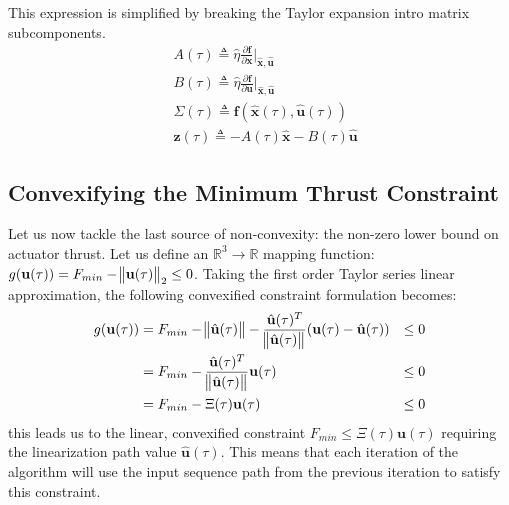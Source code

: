 This expression is simplified by breaking the Taylor expansion intro matrix subcomponents. 
\begin{align}
& A(\tau) \triangleq \hat{\eta} \frac{\partial \mathbf{f}}{\partial \mathbf{x}}  \bigg\rvert_{\mathbf{\hat{x}}, \mathbf{\hat{u}}} \\
& B(\tau) \triangleq \hat{\eta} \frac{\partial \mathbf{f}}{\partial \mathbf{u}}  \bigg\rvert_{\mathbf{\hat{x}}, \mathbf{\hat{u}}} \\
& \Sigma(\tau) \triangleq \mathbf{f}(\hat{\mathbf{x}}(\tau), \hat{\mathbf{u}}(\tau)) \\
& \mathbf{z}(\tau) \triangleq -A(\tau)\mathbf{\hat{x}}- B(\tau)\mathbf{\hat{u}}
\end{align}





\subsection{Convexifying the Minimum Thrust Constraint}
Let us now tackle the last source of non-convexity: the non-zero lower bound on actuator thrust. Let us define an $\mathbb{R}^3 \rightarrow \mathbb{R}$ mapping function: $g(\mathbf{u}(\tau)) = F_{min} - \norm{\mathbf{u}(\tau)}_2 \leq 0$. Taking the first order Taylor series linear approximation, the following convexified constraint formulation becomes:
%
\begin{align}
	g(\mathbf{u}(\tau)) &= F_{min} - \norm{\hat{\mathbf{u}}(\tau)} - \frac{\hat{\mathbf{u}}(\tau)^T}{\norm{\hat{\mathbf{u}}(\tau)}}(\mathbf{u}(\tau) - \hat{\mathbf{u}}(\tau)) & \leq 0 \\
	&= F_{min} - \frac{\hat{\mathbf{u}}(\tau)^T}{\norm{\hat{\mathbf{u}}(\tau)}} \mathbf{u}(\tau)  & \leq 0\\
	&= F_{min} - \Xi(\tau)\mathbf{u}(\tau)  & \leq 0
\end{align}
this leads us to the linear, convexified constraint $F_{min} \leq \Xi(\tau)\mathbf{u}(\tau)$ requiring the linearization path value $\hat{\mathbf{u}}(\tau)$. This means that each iteration of the algorithm will use the input sequence path from the previous iteration to satisfy this constraint.








